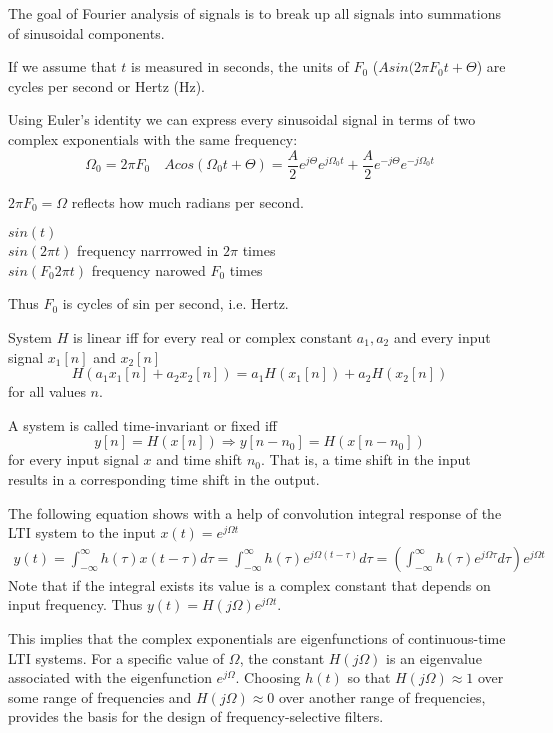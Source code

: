 \documentclass[oneside, final, 14pt]{extarticle}
\begin{document}
The goal of Fourier analysis of signals is to break up all signals into
summations of sinusoidal components.

If we assume that $t$ is measured in seconds, the units of $F_0$
($A sin (2 \pi F_0 t + \Theta$) are cycles per second or Hertz (Hz).

Using Euler's identity we can express every sinusoidal signal in terms
of two complex exponentials with the same frequency:
\[
  \Omega_0 = 2 \pi F_0 \quad
  A cos(\Omega_0 t + \Theta) =
	\frac{A}{2} e^{j\Theta} e^{j\Omega_0 t} +
  \frac{A}{2} e^{-j\Theta} e^{-j\Omega_0 t}
\]

$2 \pi F_0 = \Omega$ reflects how much radians per second.

\begin{center}
  $sin(t)$ \\
  $sin(2 \pi t)$
	frequency narrrowed in $2 \pi$ times \\
  $sin(F_0 2 \pi t)$
  frequency narowed $F_0$ times
\end{center}
Thus $F_0$ is cycles of sin per second, i.e. Hertz.

System $H$ is linear iff for every real or complex constant $a_1, a_2$
and every input signal $x_1[n]$ and $x_2[n]$
\[
  H(a_1x_1[n] + a_2x_2[n]) =
  a_1 H(x_1[n]) + a_2 H(x_2[n])
\]
for all values $n$.

A system is called time-invariant or fixed iff
\[
  y[n] = H(x[n]) \Rightarrow y[n - n_0] = H(x[n - n_0])
\]
for every input signal $x$ and time shift $n_0$. That is, a time shift
in the input results in a corresponding time shift in the output.

The following equation shows with a help of convolution integral response
of the LTI system to the input $x(t) = e^{j\Omega t}$
\begin{align*}
  y(t) = \int_{-\infty}^{\infty} h(\tau)x(t - \tau) d \tau =
	\int_{-\infty}^{\infty} h(\tau) e^{j\Omega(t - \tau)} d \tau =
	\left(
    \int_{-\infty}^{\infty} h(\tau) e^{j\Omega\tau} d \tau
  \right)
	e^{j\Omega t}
\end{align*}
Note that if the integral exists its value is a complex constant that depends
on input frequency.
Thus $y(t) = H(j\Omega)e^{j\Omega t}$.

This implies that the complex exponentials are eigenfunctions
of continuous-time LTI systems.
For a specific value of $\Omega$, the constant $H(j\Omega)$ is an eigenvalue
associated with the eigenfunction $e^{j\Omega}$.
Choosing $h(t)$ so that $H(j\Omega) \approx 1$ over some range of frequencies
and $H(j\Omega) \approx 0$ over another range of frequencies,
provides the basis for the design of frequency-selective filters.
\end{document}

